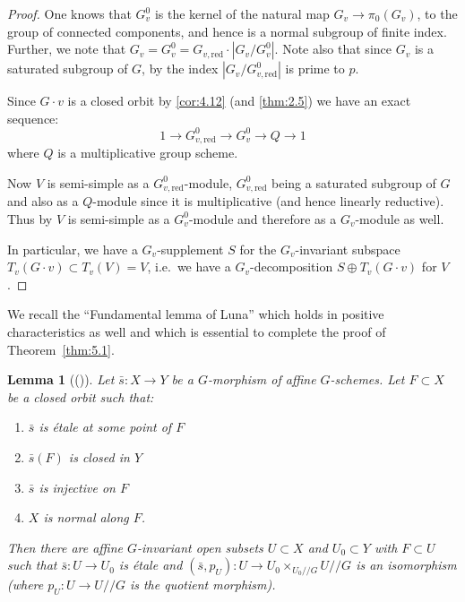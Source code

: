 \documentclass[11pt,a4paper]{article}
\theoremstyle{plain}
\newtheorem{lemma}[theorem]{Lemma}
\theoremstyle{definition}
\newcommand{\red}{\mathrm{red}}
\begin{document}
\begin{proof}
One knows that $G_v^0$ is the kernel of the natural map $G_v \to \pi_0(G_v)$, to the group of connected components, and hence is a normal subgroup of finite index. Further, we note that $G_v = G_v^0 = G_{v,\red} \cdot |G_v/G_v^0|$. Note also that since $G_v$ is a saturated subgroup of $G$, by \cite[page~23, Property 3]{S2} the index $|G_v/G_{v,\red}^0|$ is prime to $p$.

Since $G \cdot v$ is a closed orbit by \ref{cor:4.12} (and \ref{thm:2.5}) we have an exact sequence:
\begin{equation} \label{eq:5.4.1}
1 \to G_{v,\red}^0 \to G_v^0 \to Q \to 1
\end{equation}
where $Q$ is a multiplicative group scheme.

Now $V$ is semi-simple as a $G_{v,\red}^0$-module, $G_{v,\red}^0$ being a saturated subgroup of $G$ and also as a $Q$-module since it is multiplicative (and hence linearly reductive). Thus by \cite[Lemme~4.2]{D} $V$ is semi-simple as a $G_v^0$-module and therefore as a $G_v$-module as well.

In particular, we have a $G_v$-supplement $S$ for the $G_v$-invariant subspace $T_v(G \cdot v) \subset T_v(V) = V$, i.e.~we have a $G_v$-decomposition $S \oplus T_v(G \cdot v)$ for $V$. \qedhere
\end{proof}

We recall the ``Fundamental lemma of Luna'' which holds in positive characteristics as well and which is essential to complete the proof of Theorem~\ref{thm:5.1}.

\begin{lemma}[{(\cite[page~152]{GIT})}] \label{lem:5.5}
Let $\bar{s} : X \to Y$ be a $G$-morphism of affine $G$-schemes. Let $F \subset X$ be a closed orbit such that:
\begin{enumerate}
\item $\bar{s}$ is \'etale at some point of $F$
\item $\bar{s}(F)$ is closed in $Y$
\item $\bar{s}$ is injective on $F$
\item $X$ is normal along $F$.
\end{enumerate}
Then there are affine $G$-invariant open subsets $U \subset X$ and $U_0 \subset Y$ with $F \subset U$ such that $\bar{s} : U \to U_0$ is \'etale and $(\bar{s}, p_U) : U \to U_0 \times_{U_0/\!/G} U/\!/G$ is an isomorphism (where $p_U : U \to U/\!/G$ is the quotient morphism).
\end{lemma}
\end{document}
